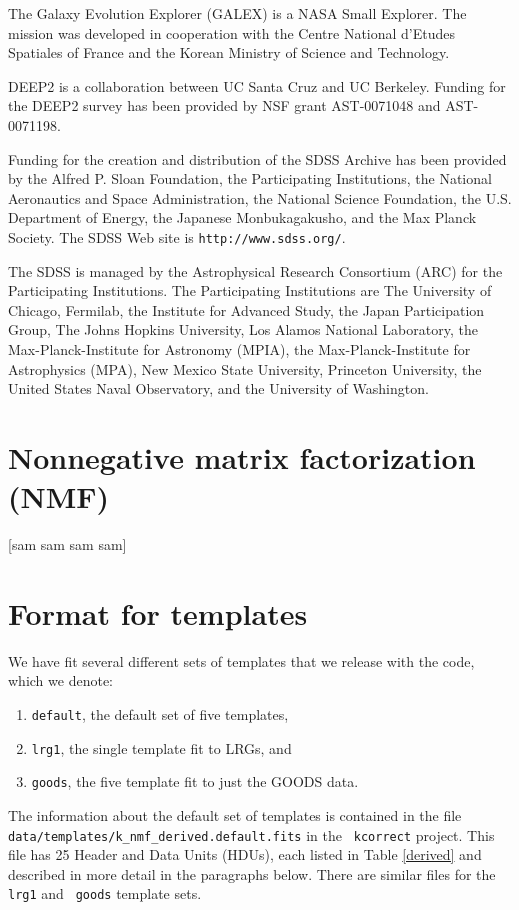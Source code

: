 \documentclass[10pt,preprint]{aastex}
\begin{document}
The Galaxy Evolution Explorer (GALEX) is a NASA Small Explorer. The
mission was developed in cooperation with the Centre National d'Etudes
Spatiales of France and the Korean Ministry of Science and Technology.

DEEP2 is a collaboration between UC Santa Cruz and UC Berkeley.
Funding for the DEEP2 survey has been provided by NSF grant
AST-0071048 and AST-0071198.

Funding for the creation and distribution of the SDSS Archive has been
provided by the Alfred P. Sloan Foundation, the Participating
Institutions, the National Aeronautics and Space Administration, the
National Science Foundation, the U.S. Department of Energy, the
Japanese Monbukagakusho, and the Max Planck Society. The SDSS Web site
is {\tt http://www.sdss.org/}.

The SDSS is managed by the Astrophysical Research Consortium (ARC) for
the Participating Institutions. The Participating Institutions are The
University of Chicago, Fermilab, the Institute for Advanced Study, the
Japan Participation Group, The Johns Hopkins University, Los Alamos
National Laboratory, the Max-Planck-Institute for Astronomy (MPIA),
the Max-Planck-Institute for Astrophysics (MPA), New Mexico State
University, Princeton University, the United States Naval Observatory,
and the University of Washington.
 



\appendix

\section{Nonnegative matrix factorization (NMF)}
\label{nmf}

[sam sam sam sam]

\section{Format for templates}
\label{format}

We have fit several different sets of templates that we release
with the code, which we denote:
\begin{enumerate}
\item {\tt default}, the default set of five templates, 
\item {\tt lrg1}, the single template fit to LRGs, and 
\item {\tt goods}, the five template fit to just the GOODS data.
\end{enumerate}
The information about the default set of templates is contained in the
file {\tt data/templates/k\_nmf\_derived.default.fits} in the {\tt
kcorrect} project.  This file has 25 Header and Data Units (HDUs),
each listed in Table \ref{derived} and described in more detail in the
paragraphs below.  There are similar files for the {\tt lrg1} and {\tt
goods} template sets.
\end{document}
